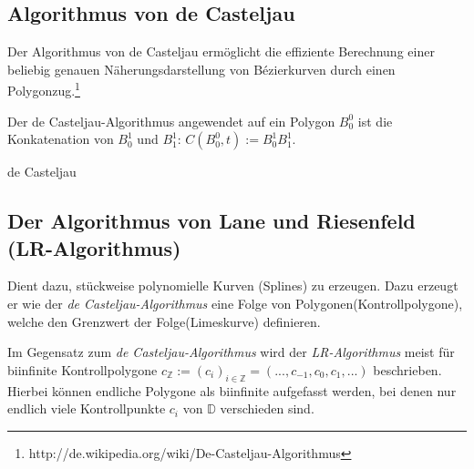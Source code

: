 \subsection{Algorithmus von de Casteljau}
Der Algorithmus von de Casteljau ermöglicht die effiziente Berechnung einer beliebig genauen Näherungsdarstellung von Bézierkurven durch einen Polygonzug.\footnote{http://de.wikipedia.org/wiki/De-Casteljau-Algorithmus}

Der de Casteljau-Algorithmus angewendet auf ein Polygon \(B_0^0\) ist die Konkatenation von \(B_0^1\) und \(B_1^1\): \(C(B_0^0,t) := B_0^1 B_1^1\).

\begin{algorithm}[H]
	\caption{de Casteljau}

	\BlankLine

\end{algorithm}

\subsection{Der Algorithmus von Lane und Riesenfeld (LR-Algorithmus)}
Dient dazu, stückweise polynomielle Kurven (Splines) zu erzeugen. Dazu erzeugt er wie der \textit{de Casteljau-Algorithmus} eine Folge von Polygonen(Kontrollpolygone), welche den Grenzwert der Folge(Limeskurve) definieren.

Im Gegensatz zum \textit{de Casteljau-Algorithmus} wird der \textit{LR-Algorithmus} meist für biinfinite Kontrollpolygone \(c_\mathbb{Z} := (c_i)_{i \in \mathbb{Z}} = (...,c_{-1},c_0,c_1,...)\) beschrieben. Hierbei können endliche Polygone als biinfinite aufgefasst werden, bei denen nur endlich viele Kontrollpunkte \(c_i\) von \(\mathbb{D}\) verschieden sind.

